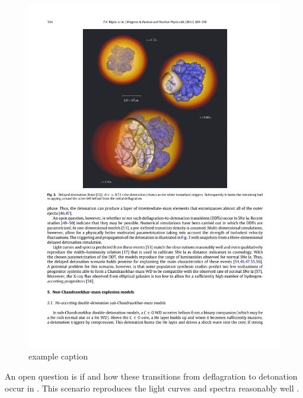 \begin{figure}[htbp] %
   \centering
   \includegraphics[width=\textwidth]{chapter_intro/plots/roepke2007.pdf}
   \caption{example caption}
   \label{fig:snia_ddt_roepke2007}
\end{figure}

An open question is if and how these transitions from deflagration to detonation occur in \sneia. This scenario reproduces the light curves and spectra reasonably well \citep{2009Natur.460..869K}. 



